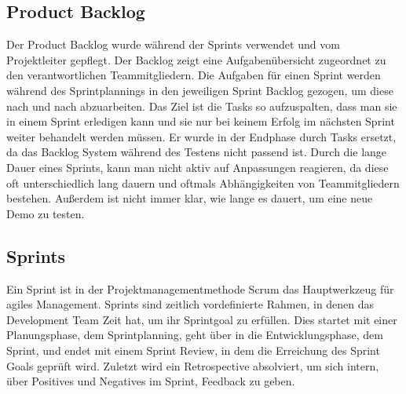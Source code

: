 \subsection{Product Backlog}\label{subsec:product-backlog}
%

Der Product Backlog wurde während der Sprints verwendet und vom Projektleiter gepflegt. Der Backlog zeigt eine Aufgabenübersicht zugeordnet zu den verantwortlichen Teammitgliedern.
Die Aufgaben für einen Sprint werden während des Sprintplannings in den jeweiligen Sprint Backlog gezogen, um diese nach und nach abzuarbeiten.
Das Ziel ist die Tasks so aufzuspalten, dass man sie in einem Sprint erledigen kann und sie nur bei keinem Erfolg im nächsten Sprint weiter behandelt werden müssen.
Er wurde in der Endphase durch Tasks ersetzt, da das Backlog System während des Testens nicht passend ist. Durch die lange Dauer eines Sprints, kann man nicht aktiv auf Anpassungen reagieren,
da diese oft unterschiedlich lang dauern und oftmals Abhängigkeiten von Teammitgliedern bestehen. Außerdem ist nicht immer klar, wie lange es dauert, um eine neue Demo zu testen.
%

\subsection{Sprints}\label{subsec:sprints}
%
Ein Sprint ist in der Projektmanagementmethode Scrum das Hauptwerkzeug für agiles Management. Sprints sind zeitlich vordefinierte Rahmen, in denen das Development Team Zeit hat, um ihr Sprintgoal zu erfüllen.
Dies startet mit einer Planungsphase, dem Sprintplanning, geht über in die Entwicklungsphase, dem Sprint, und endet mit einem Sprint Review, in dem die Erreichung des Sprint Goals geprüft wird.
Zuletzt wird ein Retrospective absolviert, um sich intern, über Positives und Negatives im Sprint, Feedback zu geben.
%

\renewcommand{\kapitelautor}{}
